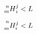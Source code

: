 \documentclass[nofonts]{ctexbook}
\begin{document}
$ \prescript{n}{m}{H}^j_i < L$

$ \prescript{n}{m}{H^j_i} < L$
\end{document}
